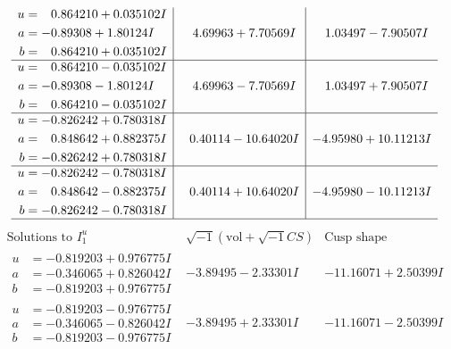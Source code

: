\documentclass[1p]{elsarticle_modified}
\theoremstyle{definition}
\newcommand{\I}{\sqrt{-1}}
\begin{document}
$$\begin{array}{c|c|c}
\begin{aligned}
u &= \phantom{-}0.864210 + 0.035102 I \\
a &= -0.89308 + 1.80124 I \\
b &= \phantom{-}0.864210 + 0.035102 I\end{aligned}
 & \phantom{-}4.69963 + 7.70569 I & \phantom{-}1.03497 - 7.90507 I \\ \hline\begin{aligned}
u &= \phantom{-}0.864210 - 0.035102 I \\
a &= -0.89308 - 1.80124 I \\
b &= \phantom{-}0.864210 - 0.035102 I\end{aligned}
 & \phantom{-}4.69963 - 7.70569 I & \phantom{-}1.03497 + 7.90507 I \\ \hline\begin{aligned}
u &= -0.826242 + 0.780318 I \\
a &= \phantom{-}0.848642 + 0.882375 I \\
b &= -0.826242 + 0.780318 I\end{aligned}
 & \phantom{-}0.40114 - 10.64020 I & -4.95980 + 10.11213 I \\ \hline\begin{aligned}
u &= -0.826242 - 0.780318 I \\
a &= \phantom{-}0.848642 - 0.882375 I \\
b &= -0.826242 - 0.780318 I\end{aligned}
 & \phantom{-}0.40114 + 10.64020 I & -4.95980 - 10.11213 I\\
 \hline 
 \end{array}$$\newpage$$\begin{array}{c|c|c}  
\text{Solutions to }I^u_{1}& \I (\text{vol} + \sqrt{-1}CS) & \text{Cusp shape}\\
 \hline 
\begin{aligned}
u &= -0.819203 + 0.976775 I \\
a &= -0.346065 + 0.826042 I \\
b &= -0.819203 + 0.976775 I\end{aligned}
 & -3.89495 - 2.33301 I & -11.16071 + 2.50399 I \\ \hline\begin{aligned}
u &= -0.819203 - 0.976775 I \\
a &= -0.346065 - 0.826042 I \\
b &= -0.819203 - 0.976775 I\end{aligned}
 & -3.89495 + 2.33301 I & -11.16071 - 2.50399 I \\ \hline\begin{aligned}

\end{aligned}
\end{array}$$
\end{document}

